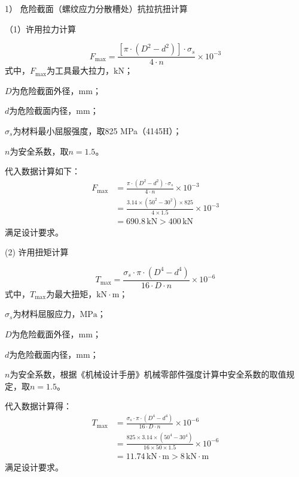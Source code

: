 1） 危险截面（螺纹应力分散槽处）抗拉抗扭计算

（1）许用拉力计算

\begin{equation}
    F_{\max} = \frac{[\pi \cdot (D^2 - d^2)] \cdot \sigma_s}{4 \cdot n} \times 10^{-3}
\end{equation}
式中，$F_{\max}$为工具最大拉力，$\mathrm{kN}$；

$D$为危险截面外径，$\mathrm{mm}$；

$d$为危险截面内径，$\mathrm{mm}$；

$\sigma_s$为材料最小屈服强度，取825 MPa（4145H）；

$n$为安全系数，取$n = 1.5$。

代入数据计算如下：
\begin{equation}
\begin{aligned}
    F_{\max} &= \frac{\pi \cdot (D^2 - d^2) \cdot \sigma_s}{4 \cdot n} \times 10^{-3} \\
             &= \frac{3.14 \times (50^2 - 30^2) \times 825}{4 \times 1.5} \times 10^{-3} \\
             &= 690.8 \, \text{kN} > 400 \, \text{kN}
\end{aligned}
\end{equation}
满足设计要求。

(2) 许用扭矩计算

\begin{equation}
    T_{\max} = \frac{\sigma_s \cdot \pi \cdot (D^4 - d^4)}{16 \cdot D \cdot n} \times 10^{-6}
\end{equation}
式中，$T_{\max}$为最大扭矩，$\mathrm{kN\cdot m}$；

$\sigma_s$为材料屈服应力，$\mathrm{MPa}$；

$D$为危险截面外径，$\mathrm{mm}$；

$d$为危险截面内径，$\mathrm{mm}$；

$n$为安全系数，根据《机械设计手册》机械零部件强度计算中安全系数的取值规定\cite{ref26}，取$n = 1.5$。

代入数据计算得：
\begin{equation}
\begin{aligned}
    T_{\max} &= \frac{\sigma_s \cdot \pi \cdot (D^4 - d^4)}{16 \cdot D \cdot n} \times 10^{-6} \\
             &= \frac{825 \times 3.14 \times (50^4 - 30^4)}{16 \times 50 \times 1.5} \times 10^{-6} \\
             &= 11.74 \, \text{kN} \cdot \text{m} > 8 \, \text{kN} \cdot \text{m} 
\end{aligned}
\end{equation}
满足设计要求。

